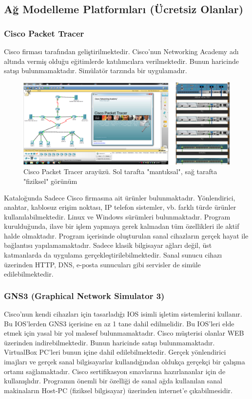 \subsection{Ağ Modelleme Platformları (Ücretsiz Olanlar)}
\subsubsection{Cisco Packet Tracer}
Cisco firması tarafından geliştirilmektedir. Cisco'nun Networking Academy adı altında vermiş olduğu eğitimlerde katılımcılara verilmektedir. Bunun haricinde satışı bulunmamaktadır. Simülatör tarzında bir uygulamadır.

\begin{figure}[H]
    \centering
    \includegraphics[width=\textwidth]{images/SimulatorCiscoPT.png}
    \caption{Cisco Packet Tracer arayüzü. Sol tarafta "mantıksal", sağ tarafta "fiziksel" görünüm}
    \label{fig:CiscoPT}
\end{figure}

Kataloğunda Sadece Cisco firmasına ait ürünler bulunmaktadır. Yönlendirici, anahtar, kablosuz erişim noktası, IP telefon sistemler, vb. farklı türde ürünler kullanılabilmektedir. Linux ve Windows sürümleri bulunmaktadır. Program kurulduğunda, ilave bir işlem yapmaya gerek kalmadan tüm özellikleri ile aktif halde olmaktadır. Program içerisinde oluşturulan sanal cihazların gerçek hayat ile bağlantısı yapılamamaktadır. Sadece klasik bilgisayar ağları değil, üst katmanlarda da uygulama gerçekleştirilebilmektedir. Sanal sunucu cihazı üzerinden HTTP, DNS, e-posta sunucuları gibi servisler de simüle edilebilmektedir.

\subsubsection{GNS3 (Graphical Network Simulator 3)}
Cisco'nun kendi cihazları için tasarladığı IOS isimli işletim sistemlerini kullanır. Bu IOS'lerden GNS3 içerisine en az 1 tane dahil edilmelidir. Bu IOS'leri elde etmek için yasal bir yol malesef bulunmamaktadır. Cisco müşterisi olanlar WEB üzerinden indirebilmektedir. Bunun haricinde satışı bulunmamaktadır. VirtualBox PC'leri bunun içine dahil edilebilmektedir. Gerçek yönlendirici imajları ve gerçek sanal bilgisayarlar kullandığından oldukça gerçekçi bir çalışma ortamı sağlamaktadır. Cisco sertifikasyon sınavlarına hazırlananlar için de kullanışlıdır. Programın önemli bir özelliği de sanal ağda kullanılan sanal makinaların Host-PC (fiziksel bilgisayar) üzerinden internet'e çıkabilmesidir.

